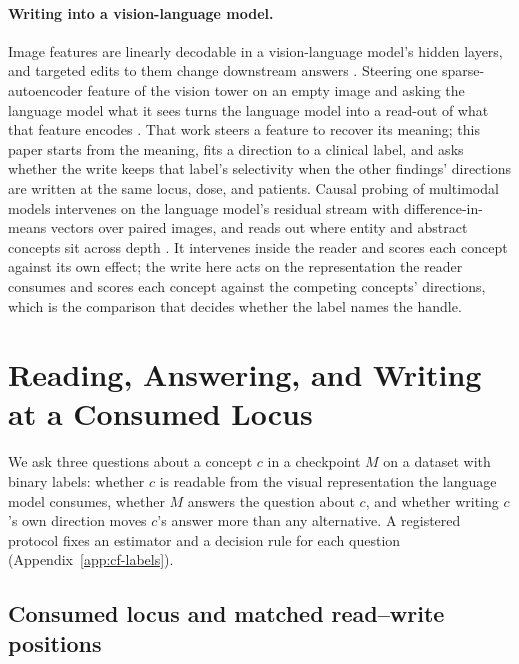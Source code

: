 \documentclass{article}
\begin{document}
\paragraph{Writing into a vision-language model.}
Image features are linearly decodable in a vision-language model's hidden layers, and targeted edits to them change downstream answers \citep{rajaram2025lineofsight}. Steering one sparse-autoencoder feature of the vision tower on an empty image and asking the language model what it sees turns the language model into a read-out of what that feature encodes \citep{ferrando2026explain}. That work steers a feature to recover its meaning; this paper starts from the meaning, fits a direction to a clinical label, and asks whether the write keeps that label's selectivity when the other findings' directions are written at the same locus, dose, and patients. Causal probing of multimodal models intervenes on the language model's residual stream with difference-in-means vectors over paired images, and reads out where entity and abstract concepts sit across depth \citep{deng2026causal}. It intervenes inside the reader and scores each concept against its own effect; the write here acts on the representation the reader consumes and scores each concept against the competing concepts' directions, which is the comparison that decides whether the label names the handle.
\section{Reading, Answering, and Writing at a Consumed Locus}
\label{sec:framework}

We ask three questions about a concept $c$ in a checkpoint $M$ on a dataset with binary labels: whether $c$ is readable from the visual representation the language model consumes, whether $M$ answers the question about $c$, and whether writing $c$'s own direction moves $c$'s answer more than any alternative. A registered protocol fixes an estimator and a decision rule for each question (Appendix~\ref{app:cf-labels}).

\subsection{Consumed locus and matched read--write positions}
\label{sec:locus}
\end{document}
